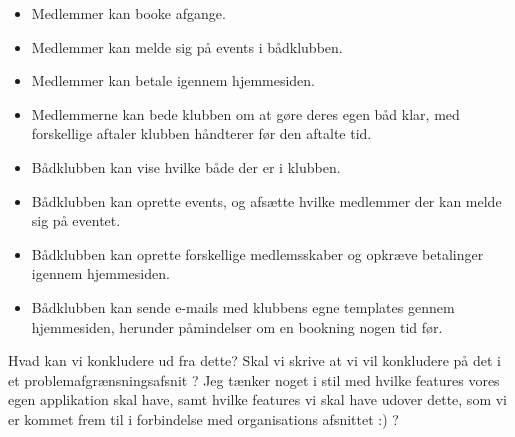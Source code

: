 \begin{itemize}
	\item Medlemmer kan booke afgange.
	\item Medlemmer kan melde sig på events i bådklubben.
	\item Medlemmer kan betale igennem hjemmesiden.
	\item Medlemmerne kan bede klubben om at gøre deres egen båd klar, med forskellige aftaler klubben håndterer
        før den aftalte tid.
	\item Bådklubben kan vise hvilke både der er i klubben.
	\item Bådklubben kan oprette events, og afsætte hvilke medlemmer der kan melde sig på eventet.
	\item Bådklubben kan oprette forskellige medlemsskaber og opkræve betalinger igennem hjemmesiden.
	\item Bådklubben kan sende e-mails med klubbens egne templates gennem hjemmesiden, herunder påmindelser om en
        bookning nogen tid før.
\end{itemize}

\begin{anfxnote}{Hvad kan vi konkludere ud fra dette?}
  Skal vi skrive at vi vil konkludere på det i et problemafgrænsningsafsnit ? Jeg tænker noget i stil med
  hvilke features vores egen applikation skal have, samt hvilke features vi skal have udover dette, som vi er
  kommet frem til i forbindelse med organisations afsnittet :) ?
\end{anfxnote}

\cbend
